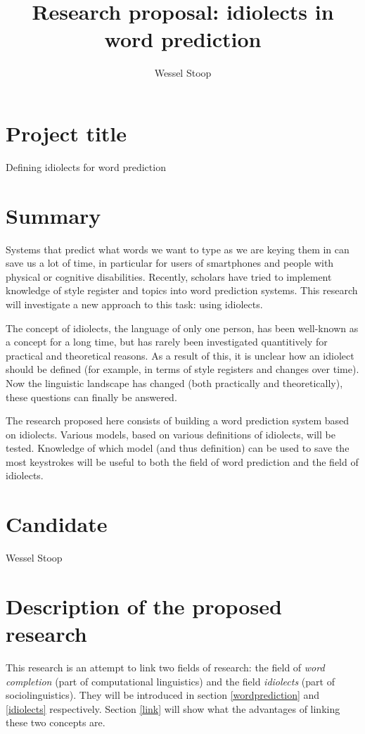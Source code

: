 \documentclass[12pt]{article}
\title{Research proposal: idiolects in word prediction}
\author{Wessel Stoop}
\begin{document}
\section{Project title}
Defining idiolects for word prediction

\section{Summary}
Systems that predict what words we want to type as we are keying them in can save us a lot of time, in particular for users of smartphones and people with physical or cognitive disabilities. Recently, scholars have tried to implement knowledge of style register and topics into word prediction systems. This research will investigate a new approach to this task: using idiolects.

The concept of idiolects, the language of only one person, has been well-known as a concept for a long time, but has rarely been investigated quantitively for practical and theoretical reasons. As a result of this, it is unclear how an idiolect should be defined (for example, in terms of style registers and changes over time). Now the linguistic landscape has changed (both practically and theoretically), these questions can finally be answered.

The research proposed here consists of building a word prediction system based on idiolects. Various models, based on various definitions of idiolects, will be tested. Knowledge of which model (and thus definition) can be used to save the most keystrokes will be useful to both the field of word prediction and the field of idiolects.

\section{Candidate}
Wessel Stoop

\section{Description of the proposed research}

This research is an attempt to link two fields of research: the field of \emph{word completion} (part of computational linguistics) and the field \emph{idiolects} (part of sociolinguistics). They will be introduced in section \ref{wordprediction} and \ref{idiolects} respectively. Section \ref{link} will show what the advantages of linking these two concepts are.
\end{document}
